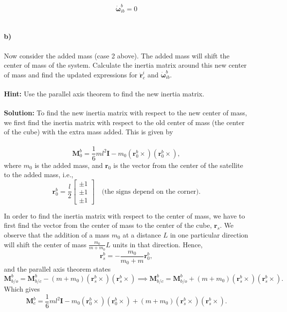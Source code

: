 \begin{equation}
    \dot{\boldsymbol{\omega}}_{ib}^b = 0
\end{equation}
\\
\\
\textbf{b)}
\\
\\
Now consider the added mass (case 2 above). The added mass will shift the center of mass of the system. Calculate the inertia matrix around this new center of mass and find the updated expressions for $\ddot{\mathbf{r}}_c^i$ and $\dot{\boldsymbol{\omega}}_{ib}^b$.
\\
\\
\textbf{Hint:} Use the parallel axis theorem to find the new inertia matrix.
\\
\\
\textbf{Solution:} To find the new inertia matrix with respect to the new center of mass, we first find the inertia matrix with respect to the old center of mass (the center of the cube) with the extra mass added. This is given by
\\
\\
\begin{equation}
    \mathbf{M}_0^b = \frac{1}{6} m l^2 \mathbf{I} - m_0 \left( \mathbf{r}_0^b \times \right) \left( \mathbf{r}_0^b \times \right),
\end{equation}
where $m_0$ is the added mass, and $\mathbf{r}_0$ is the vector from the center of the satellite to the added mass, i.e.,
\begin{equation}
    \mathbf{r}_0^b = \frac{l}{2}
    \begin{bmatrix}
        \pm 1 \\
        \pm 1 \\
        \pm 1
    \end{bmatrix} \quad \text{(the signs depend on the corner)}.
\end{equation}

In order to find the inertia matrix with respect to the center of mass, we have to first find the vector from the center of mass to the center of the cube, $\mathbf{r}_s$. We observe that the addition of a mass $m_0$ at a distance $L$ in one particular direction will shift the center of mass $\frac{m_0}{m + m_0} L$ units in that direction. Hence,
\begin{equation}
    \mathbf{r}_s^b = -\frac{m_0}{m_0 + m} \mathbf{r}_0^b,
\end{equation}
and the parallel axis theorem states
\begin{equation}
    \mathbf{M}_{b/o}^b = \mathbf{M}_{b/c}^b - (m + m_0) \left( \mathbf{r}_s^b \times \right) \left( \mathbf{r}_s^b \times \right) \implies \mathbf{M}_{b/c}^b = \mathbf{M}_{b/o}^b + (m + m_0) \left( \mathbf{r}_s^b \times \right) \left( \mathbf{r}_s^b \times \right).
\end{equation}
Which gives
\begin{equation}
    \mathbf{M}_c^b = \frac{1}{6} m l^2 \mathbf{I} - m_0 \left( \mathbf{r}_0^b \times \right) \left( \mathbf{r}_0^b \times \right) + (m + m_0) \left( \mathbf{r}_s^b \times \right) \left( \mathbf{r}_s^b \times \right).
\end{equation}

